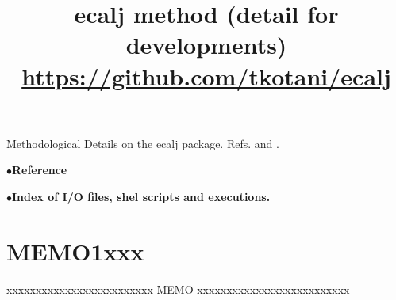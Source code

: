 \documentclass[a4paper,10pt,epsf,fleqn]{article}
\begin{document}
\baselineskip=6mm
\title{ ecalj method (detail for developments)\\ 
{\large \url{https://github.com/tkotani/ecalj}}}
\maketitle
{}
\noindent 
Methodological Details on the ecalj package. Refs.
\cite{kotani2015pmt} and \cite{kotani_quasiparticle_2014}.

\tableofcontents
\vspace{5mm}
\noindent$\bullet${\bf Reference}

\vspace{5mm}
\noindent$\bullet${\bf Index of I/O files, shel scripts and executions.}

\newpage


\section{MEMO1xxx}

xxxxxxxxxxxxxxxxxxxxxxxxx MEMO xxxxxxxxxxxxxxxxxxxxxxxxxx\\
\end{document}
